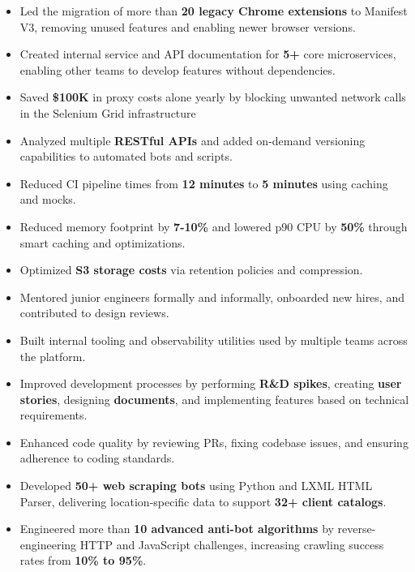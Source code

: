 \documentclass[11pt]{article}       %
\begin{document}
\begin{itemize}
  \item Led the migration of more than \textbf{20 legacy Chrome extensions} to Manifest V3, removing unused features and enabling newer browser versions. \\
  \item Created internal service and API documentation for \textbf{5+} core microservices, enabling other teams to develop features without dependencies. \\
  \item Saved \textbf{\$100K} in proxy costs alone yearly by blocking unwanted network calls in the Selenium Grid infrastructure \\
  \item Analyzed multiple \textbf{RESTful APIs} and added on-demand versioning capabilities to automated bots and scripts. \\
  \item Reduced CI pipeline times from \textbf{12 minutes} to \textbf{5 minutes} using caching and mocks. \\
  \item Reduced memory footprint by \textbf{7-10\%} and lowered p90 CPU by \textbf{50\%} through smart caching and optimizations. \\
  \item Optimized \textbf{S3 storage costs} via retention policies and compression. \\
  \item Mentored junior engineers formally and informally, onboarded new hires, and contributed to design reviews. \\
  \item Built internal tooling and observability utilities used by multiple teams across the platform. \\
  \item Improved development processes by performing \textbf{R\&D spikes}, creating \textbf{user stories}, designing \textbf{documents}, and implementing features based on technical requirements. \\
  \item Enhanced code quality by reviewing PRs, fixing codebase issues, and ensuring adherence to coding standards. \\
  \item Developed \textbf{50+ web scraping bots} using Python and LXML HTML Parser, delivering location-specific data to support \textbf{32+ client catalogs}. \\
  \item Engineered more than \textbf{10 advanced anti-bot algorithms} by reverse-engineering HTTP and JavaScript challenges, increasing crawling success rates from \textbf{10\% to 95\%}. \\

\end{itemize}
\end{document}
